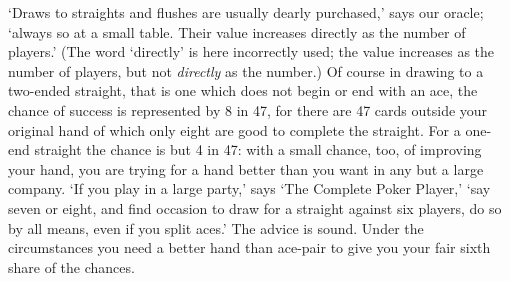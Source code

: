 \documentclass[letterpaper,12pt,oneside,openany]{memoir}
\begin{document}
`Draws to straights and flushes are usually dearly
purchased,' says our oracle; `always so at a small
table. Their value increases directly as the number of
players.' (The word `directly' is here incorrectly used;
the value increases as the number of players, but not
\textit{directly} as the number.) Of course in drawing to a
two-ended straight, that is one which does not begin or
end with an ace, the chance of success is represented
by 8 in 47, for there are 47 cards outside your original
hand of which only eight are good to complete the
straight. For a one-end straight the chance is but 4 in
47: with a small chance, too, of improving your hand,
you are trying for a hand better than you want in any
but a large company. `If you play in a large party,' says
`The Complete Poker Player,' `say seven or eight, and
find occasion to draw for a straight against six players,
do so by all means, even if you split aces.' The advice
is sound. Under the circumstances you need a better
hand than ace-pair to give you your fair sixth share of
the chances.
\end{document}

